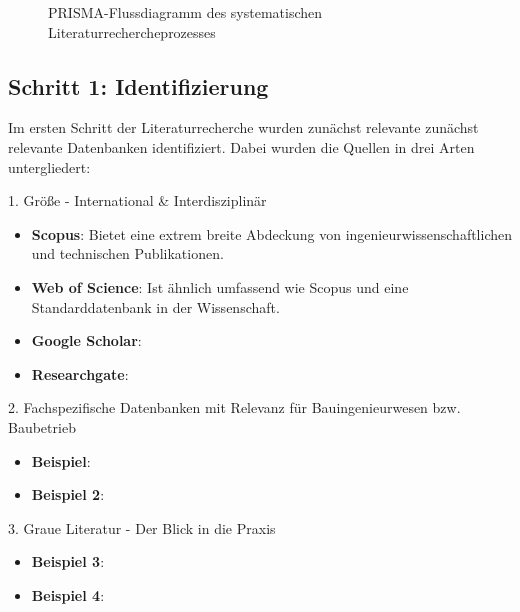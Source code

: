 \begin{figure}[hbt!]

  \caption{PRISMA-Flussdiagramm des systematischen Literaturrechercheprozesses}
  \label{fig:prisma_flowchart}
\end{figure}

\clearpage

\subsection{Schritt 1: Identifizierung}
Im ersten Schritt der Literaturrecherche wurden zunächst relevante zunächst relevante Datenbanken identifiziert. Dabei wurden die Quellen in drei Arten untergliedert:

1. Größe - International \& Interdisziplinär
\begin{itemize}[leftmargin=2em]
    \item \textbf{Scopus}: Bietet eine extrem breite Abdeckung von ingenieurwissenschaftlichen und technischen Publikationen.
    \item \textbf{Web of Science}: Ist ähnlich umfassend wie Scopus und eine Standarddatenbank in der Wissenschaft.
    \item \textbf{Google Scholar}:
    \item \textbf{Researchgate}:
    
\end{itemize}
2. Fachspezifische Datenbanken mit Relevanz für Bauingenieurwesen bzw. Baubetrieb
\begin{itemize}[leftmargin=2em]
    \item \textbf{Beispiel}: 
    \item \textbf{Beispiel 2}: 
\end{itemize}
3. Graue Literatur - Der Blick in die Praxis
\begin{itemize}[leftmargin=2em]
    \item \textbf{Beispiel 3}: 
    \item \textbf{Beispiel 4}: 
\end{itemize}

